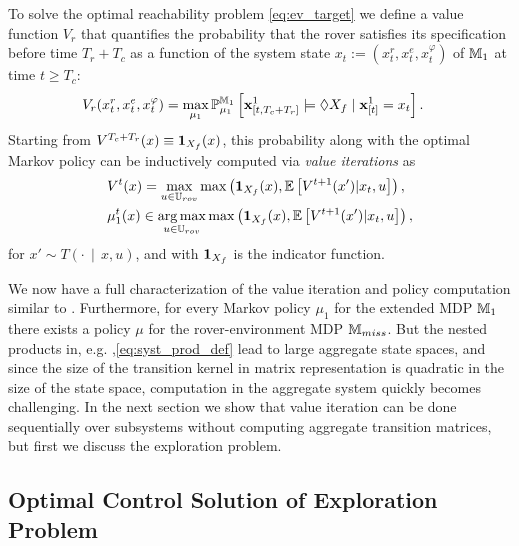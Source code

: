 \documentclass[conference]{IEEEtran}
\renewcommand{\cite}[1]{\citep{#1}}
\begin{document}
To solve the optimal reachability problem \eqref{eq:ev_target} we define a value function $V_r$ that quantifies the probability that the rover satisfies its specification before time $T_r + T_c$ as a function of the system state $x_{t}:=(x_{t}^r, x_{t}^e, x_{t}^\varphi)$ of $\mathbb{M}_1$ at time $t\geq T_c$:
\begin{equation}
\label{eq:rovervalue}
\begin{aligned}
	& V_r(x_{t}^r, x_{t}^e, x_{t}^\varphi)  = \max_{\mu_1} \mathbb{P}_{\mu_1}^{\MDP_1} \left[\mathbf{x}^1_{[t,T_c+T_r]} \models \lozenge X_f \mid \mathbf{x}_{[t]}^1 = x_{t} \right].
\end{aligned}
\end{equation}
Starting from $ V^{T_c+T_r}(x)\equiv \mathbf{1}_{X_f}(x)$, this probability along with the optimal Markov policy can be inductively computed via \emph{value iterations} as
\begin{align}
	& V^{t}(x)  = \max_{u \in \U_{rov}}  \max \left( \ind_{X_f}(x), \mathbb{E}\left[V^{t+1}(x'){\mid} x_t,u\right] \right) \label{eq:value_iter_mission}, \\
	& \pol_1^t(x) \in \argmax_{u\in \U_{rov}} \max  \left( \ind_{X_f}(x), \mathbb{E}\left[V^{t+1}(x'){\mid }x_t,u\right] \right), \notag
\end{align} 
for $x' \sim  T(\cdot\,{ \mid}\, x, u)$, and with $\mathbf{1}_{X_f}$ is the indicator function. 

We now have a full characterization of the value iteration and policy computation similar to \cite{Abate2008}. Furthermore, for every Markov policy $\mu_1$ for the extended MDP $\mathbb{M}_1$ there exists a policy $\mu$ for the rover-environment MDP $\mathbb{M}_{miss}$. But the nested products in, e.g. ,\eqref{eq:syst_prod_def} lead to large aggregate state spaces, and since the size of the transition kernel in matrix representation is quadratic in the size of the state space, computation in the aggregate system quickly becomes challenging. In the next section we show that value iteration can be done sequentially over subsystems without computing aggregate transition matrices, but first we discuss the exploration problem.

\subsection{Optimal Control Solution of Exploration Problem}
\label{sub:information}
\end{document}
